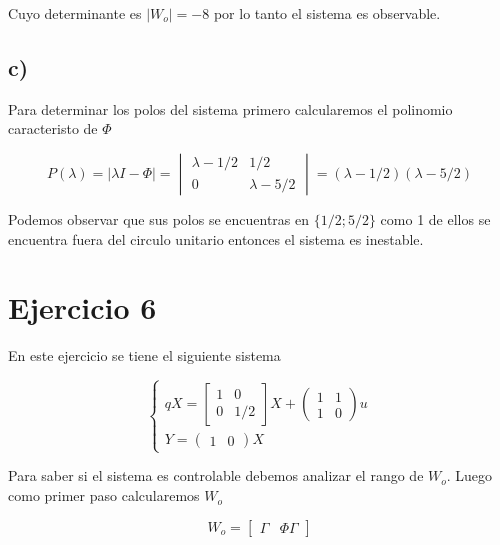 \documentclass[11pt,a4paper]{article}
\newcommand{\siseq}[1]{ \left\{ \begin{array}{c}
    #1
\end{array} \right. }
\begin{document}
    Cuyo determinante es $|W_o|=-8$ por lo tanto el sistema es observable.

    \subsection*{c)}

    Para determinar los polos del sistema primero calcularemos el polinomio caracteristo de $\Phi$
   
   \begin{equation}
       P(\lambda) = |\lambda I - \Phi| = 
       \begin{vmatrix}
        \lambda - 1/2 & 1/2 \\
        0 & \lambda - 5/2   
       \end{vmatrix} = 
       (\lambda - 1/2)(\lambda - 5/2)
   \end{equation}

   Podemos observar que sus polos se encuentras en $\{1/2;5/2\}$ como 1 de ellos se encuentra fuera del 
   circulo unitario entonces el sistema es inestable.

    \section*{Ejercicio 6}

   En este ejercicio se tiene el siguiente sistema 

   \begin{equation}
       \siseq{
           qX = 
           \begin{bmatrix}
               1 & 0 \\ 
               0 & 1/2
           \end{bmatrix}X 
           +
           \begin{pmatrix}
               1 & 1 \\ 
               1 & 0
           \end{pmatrix} u \\
           Y = 
           \begin{pmatrix}
               1 & 0
           \end{pmatrix} X
       }
   \end{equation}

   Para saber si el sistema es controlable debemos analizar el rango de $W_o$. 
   Luego como primer paso calcularemos $W_o$

   \begin{equation}
       W_o = 
       \begin{bmatrix}
           \Gamma & \Phi \Gamma
       \end{bmatrix}
   \end{equation}
\end{document}
